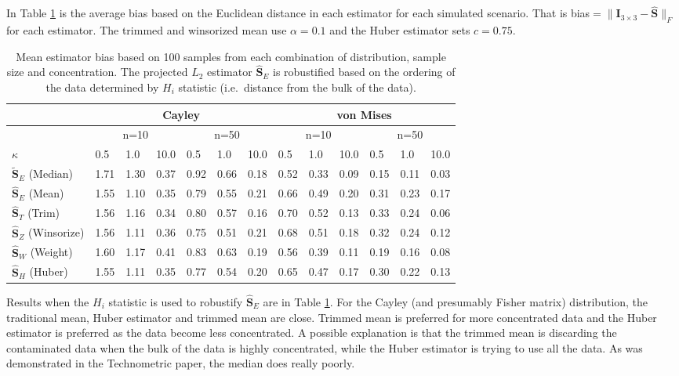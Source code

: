 \documentclass{article}\usepackage{graphicx, color}
\newcommand{\ProjMean}{{\widehat{\bm S}_{E}}}
\newcommand{\ProjMedian}{{\widetilde{\bm S}_{E}}}
\newcommand{\HuberMean}{{\widehat{\bm S}_H}}
\newcommand{\WeightMean}{{\widehat{\bm S}_W}}
\newcommand{\TrimMean}{{\widehat{\bm S}_T}}
\newcommand{\WinzMean}{{\widehat{\bm S}_Z}}
\newcommand{\red}[1]{{\color{red} #1}}
\begin{document}
In Table \ref{tab:SimResHn} is the average bias based on the Euclidean distance in each estimator for each simulated scenario.  That is bias$=\|\bm I_{3\times 3}-\widehat{\bm S}\|_F$ for each estimator.  The trimmed and winsorized mean use $\alpha=0.1$ and the Huber estimator sets $c=0.75$.


\begin{table}[ht]
\centering
\begin{tabular}{l|lll|lll|lll|lll}
  \hline
 & \multicolumn{6}{|c|}{Cayley} & \multicolumn{6}{|c}{von Mises}   \\ 
\hline
   &  \multicolumn{3}{|c|}{n=10} & \multicolumn{3}{|c|}{n=50} & \multicolumn{3}{|c|}{n=10} & \multicolumn{3}{|c}{n=50} \\ 
  $\kappa$ &  0.5 &  1.0 & 10.0 &  0.5 &  1.0 & 10.0 &  0.5 &  1.0 & 10.0 &  0.5 &  1.0 & 10.0 \\ \hline
  $\ProjMedian$ (Median) & 1.71 & 1.30 & 0.37 & 0.92 & 0.66 & 0.18 & \red{0.52 }& \red{0.33} & \red{0.09} & \red{0.15} & \red{ 0.11} & \red{ 0.03} \\ 
  $\ProjMean$ (Mean) & \red{1.55} & \red{1.10} & 0.35 & 0.79 & 0.55 & 0.21 & 0.66 & 0.49 & 0.20 & 0.31 & 0.23 & 0.17 \\ 
  $\TrimMean$ (Trim) & 1.56 & 1.16 & \red{0.34} & 0.80 & 0.57 & \red{0.16} & 0.70 & 0.52 & 0.13 & 0.33 & 0.24 & 0.06 \\ 
  $\WinzMean$ (Winsorize)& 1.56 & 1.11 & 0.36 & \red{0.75} & \red{0.51} & 0.21 & 0.68 & 0.51 & 0.18 & 0.32& 0.24 & 0.12 \\ 
  $\WeightMean$ (Weight) & 1.60 & 1.17 & 0.41 & 0.83 & 0.63 & 0.19 & 0.56 & 0.39 & 0.11 & 0.19 & 0.16 & 0.08 \\ 
  $\HuberMean$ (Huber) & \red{1.55} & 1.11 & 0.35 & 0.77 & 0.54 & 0.20 & 0.65 & 0.47 & 0.17 & 0.30 & 0.22 & 0.13 \\ 
   \hline
\end{tabular}
\caption{Mean estimator bias based on 100 samples from each combination of distribution, sample size and concentration.  The projected $L_2$ estimator $\ProjMean$ is robustified based on the ordering of the data determined by $H_i$ statistic (i.e.~distance from the bulk of the data).}
\label{tab:SimResHn}
\end{table}

Results when the $H_i$ statistic is used to robustify $\ProjMean$ are in Table \ref{tab:SimResHn}.  For the Cayley (and presumably Fisher matrix) distribution, the traditional mean, Huber estimator and trimmed mean are close.  Trimmed mean is preferred for more concentrated data and the Huber estimator is preferred as the data become less concentrated.  A possible explanation is that the trimmed mean is discarding the contaminated data when the bulk of the data is highly concentrated, while the Huber estimator is trying to use all the data.  As was demonstrated in the Technometric paper, the median does really poorly.
\end{document}
